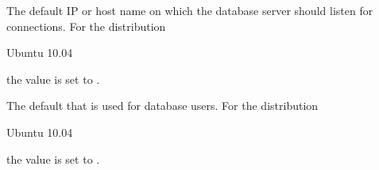 
The default IP  or host name on which the database server should
listen for connections. For the distribution
\begin{inparaitem}
\item[\TheDistribution{ubuntu}] Ubuntu 10.04
\end{inparaitem}
the value is set to .
 

The default  that is used for database users.
For the distribution
\begin{inparaitem}
\item[\TheDistribution{ubuntu}] Ubuntu 10.04
\end{inparaitem}
the value is set to .
 
